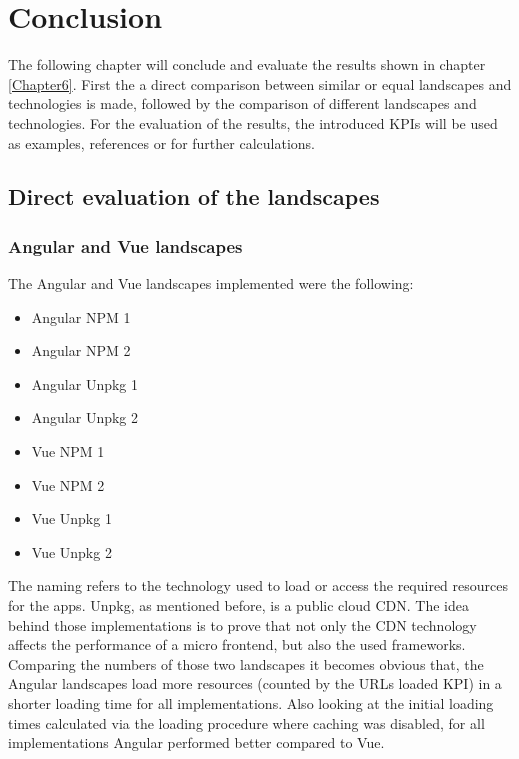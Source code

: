 \chapter{Conclusion} %
\label{Chapter7}


The following chapter will conclude and evaluate the results shown in chapter \ref{Chapter6}. First the a direct comparison between similar or equal landscapes and technologies is made, followed by the comparison of different landscapes and technologies.
For the evaluation of the results, the introduced KPIs will be used as examples, references or for further calculations.
 
\section{Direct evaluation of the landscapes}

\subsection{Angular and Vue landscapes}

The Angular and Vue landscapes implemented were the following:

\begin{itemize}[noitemsep]
	\item Angular NPM 1
	\item Angular NPM 2
	\item Angular Unpkg 1
	\item Angular Unpkg 2
	\item Vue NPM 1
	\item Vue NPM 2
	\item Vue Unpkg 1
	\item Vue Unpkg 2
\end{itemize}

The naming refers to the technology used to load or access the required resources for the apps. Unpkg, as mentioned before, is a public cloud CDN. The idea behind those implementations is to prove that not only the CDN technology affects the performance of a micro frontend, but also the used frameworks.
Comparing the numbers of those two landscapes it becomes obvious that, the Angular landscapes load more resources (counted by the URLs loaded KPI) in a shorter loading time for all implementations. 
Also looking at the initial loading times calculated via the loading procedure where caching was disabled, for all implementations Angular performed better compared to Vue.

